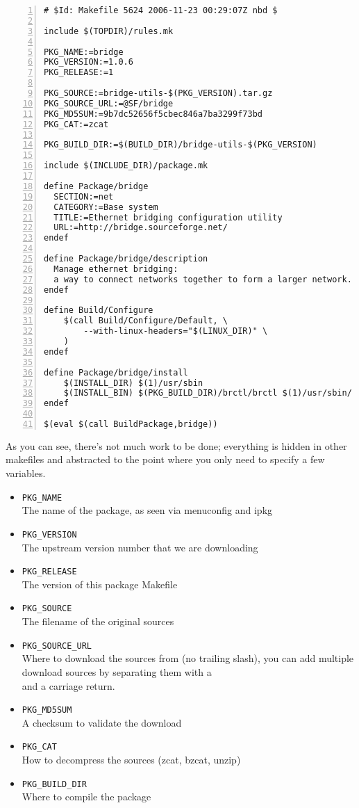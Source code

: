 \begin{Verbatim}[frame=single,numbers=left]
# $Id: Makefile 5624 2006-11-23 00:29:07Z nbd $

include $(TOPDIR)/rules.mk

PKG_NAME:=bridge
PKG_VERSION:=1.0.6
PKG_RELEASE:=1

PKG_SOURCE:=bridge-utils-$(PKG_VERSION).tar.gz
PKG_SOURCE_URL:=@SF/bridge
PKG_MD5SUM:=9b7dc52656f5cbec846a7ba3299f73bd
PKG_CAT:=zcat

PKG_BUILD_DIR:=$(BUILD_DIR)/bridge-utils-$(PKG_VERSION)

include $(INCLUDE_DIR)/package.mk

define Package/bridge
  SECTION:=net
  CATEGORY:=Base system
  TITLE:=Ethernet bridging configuration utility
  URL:=http://bridge.sourceforge.net/
endef

define Package/bridge/description
  Manage ethernet bridging: 
  a way to connect networks together to form a larger network.
endef

define Build/Configure
    $(call Build/Configure/Default, \
        --with-linux-headers="$(LINUX_DIR)" \
    )
endef

define Package/bridge/install
    $(INSTALL_DIR) $(1)/usr/sbin
    $(INSTALL_BIN) $(PKG_BUILD_DIR)/brctl/brctl $(1)/usr/sbin/
endef

$(eval $(call BuildPackage,bridge))
\end{Verbatim}

As you can see, there's not much work to be done; everything is hidden in other makefiles
and abstracted to the point where you only need to specify a few variables.

\begin{itemize}
    \item \texttt{PKG\_NAME} \\
        The name of the package, as seen via menuconfig and ipkg
    \item \texttt{PKG\_VERSION} \\
        The upstream version number that we are downloading
    \item \texttt{PKG\_RELEASE} \\
        The version of this package Makefile
    \item \texttt{PKG\_SOURCE} \\
        The filename of the original sources
    \item \texttt{PKG\_SOURCE\_URL} \\
        Where to download the sources from (no trailing slash), you can add multiple download sources by separating them with a \\ and a carriage return.
    \item \texttt{PKG\_MD5SUM} \\
        A checksum to validate the download
    \item \texttt{PKG\_CAT} \\
        How to decompress the sources (zcat, bzcat, unzip)
    \item \texttt{PKG\_BUILD\_DIR} \\
        Where to compile the package
\end{itemize}


